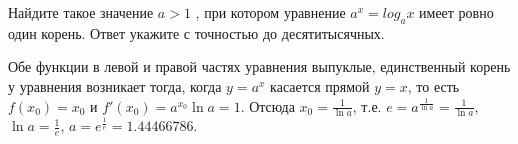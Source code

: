
Найдите такое значение $a > 1$ , при котором уравнение $a^x=log_ax$ имеет ровно один корень. Ответ укажите с точностью до десятитысячных.

\solutionSection

Обе функции в левой и правой частях уравнения выпуклые, единственный корень у уравнения возникает тогда, когда $y = a^x$ касается прямой $y = x$, то есть $f(x_0) = x_0$ и $f'(x_0) = a^{x_0} \ln a = 1$. Отсюда $x_0 = \frac{1}{\ln a}$, т.е. $e = a^{\frac{1}{\ln a}} = \frac{1}{\ln a}$, $\ln a = \frac{1}{e}$, \linebreak $a = e^{\frac{1}{e}} = 1.44466786$.

